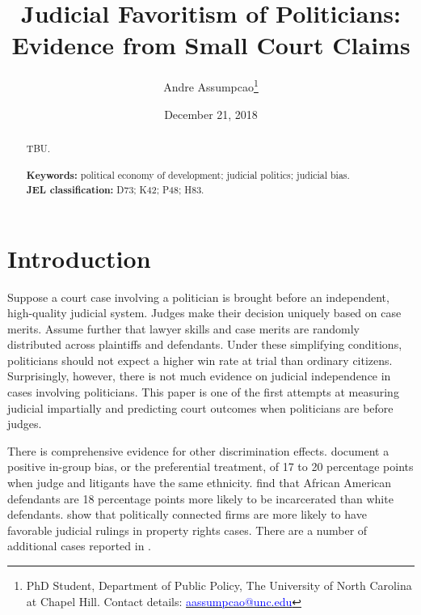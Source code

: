 \documentclass[11pt]{article}
\begin{document}
\begin{titlepage}
\title{Judicial Favoritism of Politicians: Evidence from Small Court Claims}
\author{Andre Assumpcao\thanks{PhD Student, Department of Public Policy, The University of North Carolina at Chapel Hill. Contact details: \href{mailto:aassumpcao@unc.edu}{\textcolor{blue}{aassumpcao@unc.edu}}}}
\date{December 21, 2018}

\maketitle

\begin{abstract}
\noindent TBU. \\
\vspace{0in} \\
\noindent\textbf{Keywords:} political economy of development; judicial politics; judicial bias. \\

\noindent\textbf{JEL classification:} D73; K42; P48; H83. \\

\vspace{0in}
\bigskip

\end{abstract}

\setcounter{page}{0}

\thispagestyle{empty}

\end{titlepage}

\clearpage

\section{Introduction} \label{sec:introduction_paper2}

Suppose a court case involving a politician is brought before an independent, high-quality judicial system. Judges make their decision uniquely based on case merits. Assume further that lawyer skills and case merits are randomly distributed across plaintiffs and defendants. Under these simplifying conditions, politicians should not expect a higher win rate at trial than ordinary citizens. Surprisingly, however, there is not much evidence on judicial independence in cases involving politicians. This paper is one of the first attempts at measuring judicial impartially and predicting court outcomes when politicians are before judges.

There is comprehensive evidence for other discrimination effects. \citet{ShayoJudicialIngroupBias2011} document a positive in-group bias, or the preferential treatment, of 17 to 20 percentage points when judge and litigants have the same ethnicity. \citet{AbramsJudgesVaryTheir2012} find that African American defendants are 18 percentage points more likely to be incarcerated than white defendants. \citet{LuPoliticalConnectednessCourt2015} show that politically connected firms are more likely to have favorable judicial rulings in property rights cases. There are a number of additional cases reported in \citet{RachlinskiJudgingJudiciaryNumbers2017}.
\end{document}

